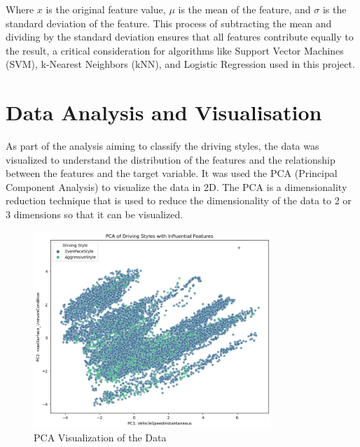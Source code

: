 Where $x$ is the original feature value, $\mu$ is the mean of the feature, and $\sigma$ is the standard deviation of the feature. This process of subtracting the mean and 
dividing by the standard deviation ensures that all features contribute equally to the result, a critical consideration for algorithms like Support Vector Machines (SVM), 
k-Nearest Neighbors (kNN), and Logistic Regression used in this project.


\section{Data Analysis and Visualisation}

As part of the analysis aiming to classify the driving styles, the data was visualized to understand the distribution of the features and the relationship between the features 
and the target variable. It was used the PCA (Principal Component Analysis) to visualize the data in 2D. The PCA is a dimensionality reduction technique that is used to reduce the
dimensionality of the data to 2 or 3 dimensions so that it can be visualized. \cite{niedoba2014multi}

\begin{figure}[H]
    \centering
    \includegraphics[width=0.8\textwidth]{images/pca_chart.png}
    \caption{PCA Visualization of the Data}
    \label{fig:pca}
\end{figure}

